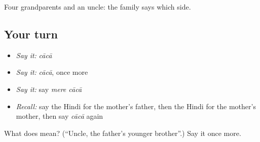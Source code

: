 \begin{grammarlens}[title={What you've built}]
Four grandparents and an uncle: the family says which side.
\end{grammarlens}

\subsection*{Your turn}
\begin{itemize}
\raggedright
  \item \emph{Say it:} \emph{cācā}
  \item \emph{Say it:} \emph{cācā}, once more
  \item \emph{Say it:} say \emph{mere cācā}
  \item \emph{Recall:} say the Hindi for the mother's father, then the Hindi for the mother's mother, then say \emph{cācā} again
\end{itemize}

\begin{tcolorbox}[breakable,colback=teal!4,colframe=teal!35!black,title={Before you move on}]
What does  mean? (\textquotedblleft{}Uncle, the father's younger brother\textquotedblright{}.) Say it once more.
\end{tcolorbox}

